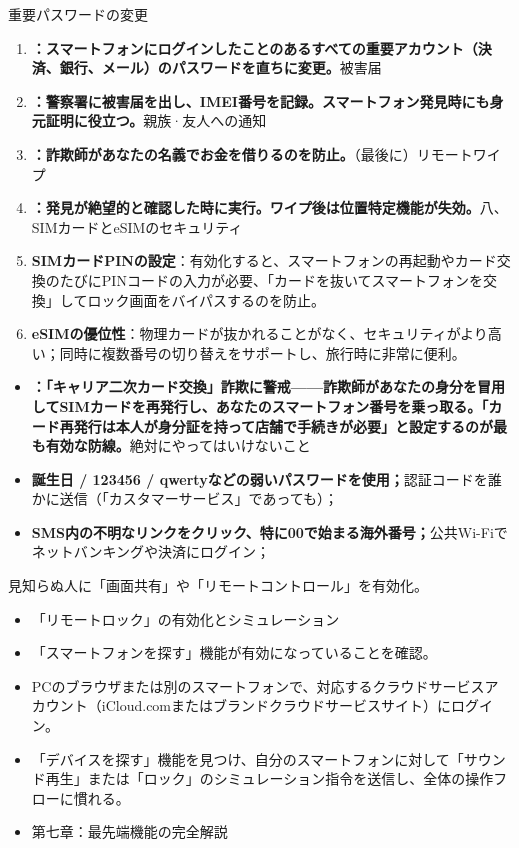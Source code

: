 
重要パスワードの変更

\begin{enumerate}
  \item \textbf{：スマートフォンにログインしたことのあるすべての重要アカウント（決済、銀行、メール）のパスワードを直ちに変更。}被害届
  \item \textbf{：警察署に被害届を出し、IMEI番号を記録。スマートフォン発見時にも身元証明に役立つ。}親族·友人への通知
  \item \textbf{：詐欺師があなたの名義でお金を借りるのを防止。}（最後に）リモートワイプ
  \item \textbf{：発見が絶望的と確認した時に実行。ワイプ後は位置特定機能が失効。}八、SIMカードとeSIMのセキュリティ
  \item \textbf{SIMカードPINの設定}：有効化すると、スマートフォンの再起動やカード交換のたびにPINコードの入力が必要、「カードを抜いてスマートフォンを交換」してロック画面をバイパスするのを防止。
  \item \textbf{eSIMの優位性}：物理カードが抜かれることがなく、セキュリティがより高い；同時に複数番号の切り替えをサポートし、旅行時に非常に便利。
\end{enumerate}


\begin{itemize}
  \item \textbf{：「キャリア二次カード交換」詐欺に警戒——詐欺師があなたの身分を冒用してSIMカードを再発行し、あなたのスマートフォン番号を乗っ取る。「カード再発行は本人が身分証を持って店舗で手続きが必要」と設定するのが最も有効な防線。}絶対にやってはいけないこと
  \item \textbf{誕生日 / 123456 / qwertyなどの弱いパスワードを使用；}認証コードを誰かに送信（「カスタマーサービス」であっても）；
  \item \textbf{SMS内の不明なリンクをクリック、特に00で始まる海外番号；}公共Wi-Fiでネットバンキングや決済にログイン；
\end{itemize}

\begin{tcbwarn}{見知らぬ人に「画面共有」や「リモートコントロール」を有効化。}
\begin{itemize}
  \item 「リモートロック」の有効化とシミュレーション
  \item 「スマートフォンを探す」機能が有効になっていることを確認。
  \item PCのブラウザまたは別のスマートフォンで、対応するクラウドサービスアカウント（iCloud.comまたはブランドクラウドサービスサイト）にログイン。
  \item 「デバイスを探す」機能を見つけ、自分のスマートフォンに対して「サウンド再生」または「ロック」のシミュレーション指令を送信し、全体の操作フローに慣れる。
  \item 第七章：最先端機能の完全解説
\end{itemize}

\end{tcbwarn}

